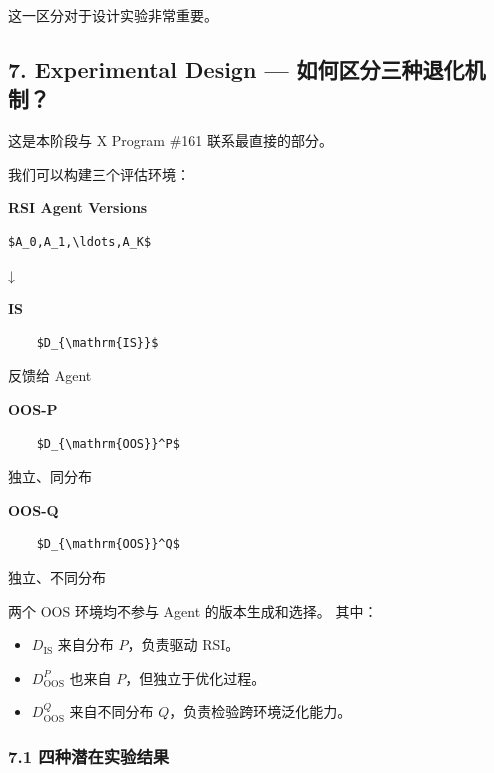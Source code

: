 这一区分对于设计实验非常重要。

\hypertarget{part-2-23-0001-experimental-design-ux5982ux4f55ux533aux5206ux4e09ux79cdux9000ux5316ux673aux5236}{%
\subsection{7. Experimental Design --- 如何区分三种退化机制？}\label{part-2-23-0001-experimental-design-ux5982ux4f55ux533aux5206ux4e09ux79cdux9000ux5316ux673aux5236}}

这是本阶段与 X Program \#161 联系最直接的部分。

我们可以构建三个评估环境：

\textbf{RSI Agent Versions}

\begin{verbatim}
$A_0,A_1,\ldots,A_K$
\end{verbatim}

↓

\textbf{IS}

\begin{verbatim}
    $D_{\mathrm{IS}}$
\end{verbatim}

反馈给 Agent

\textbf{OOS-P}

\begin{verbatim}
    $D_{\mathrm{OOS}}^P$
\end{verbatim}

独立、同分布

\textbf{OOS-Q}

\begin{verbatim}
    $D_{\mathrm{OOS}}^Q$
\end{verbatim}

独立、不同分布

两个 OOS 环境均不参与 Agent 的版本生成和选择。 其中：

\begin{itemize}
\tightlist
\item
  \(D_{\mathrm{IS}}\) 来自分布 \(P\)，负责驱动 RSI。
\item
  \(D_{\mathrm{OOS}}^P\) 也来自 \(P\)，但独立于优化过程。
\item
  \(D_{\mathrm{OOS}}^Q\) 来自不同分布 \(Q\)，负责检验跨环境泛化能力。
\end{itemize}

\hypertarget{part-2-23-0001-ux56dbux79cdux6f5cux5728ux5b9eux9a8cux7ed3ux679c}{%
\subsubsection{7.1 四种潜在实验结果}\label{part-2-23-0001-ux56dbux79cdux6f5cux5728ux5b9eux9a8cux7ed3ux679c}}

